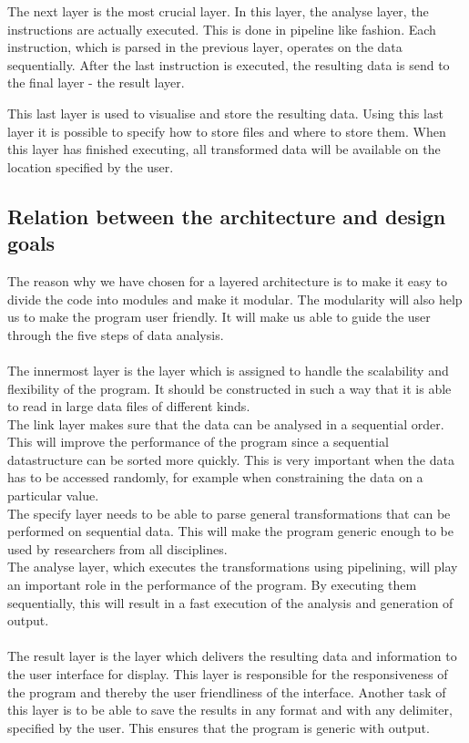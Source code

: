 \documentclass[a4paper,english,fleqn]{exam}
\begin{document}
The next layer is the most crucial layer. In this layer, the analyse layer, the instructions are actually executed. This is done in pipeline like fashion. Each instruction, which is parsed in the previous layer, operates on the data sequentially. After the last instruction is executed, the resulting data is send to the final layer - the result layer. 

This last layer is used to visualise and store the resulting data. Using this last layer it is possible to specify how to store files and where to store them. When this layer has finished executing, all transformed data will be available on the location specified by the user.

\subsection{Relation between the architecture and design goals}
The reason why we have chosen for a layered architecture is to make it easy to divide the code into modules and make it modular. The modularity will also help us to make the program user friendly. It will make us able to guide the user through the five steps of data analysis. \\ \\
The innermost layer is the layer which is assigned to handle the scalability and flexibility of the program. It should be constructed in such a way that it is able to read in large data files of different kinds. \\
The link layer makes sure that the data can be analysed in a sequential order. This will improve the performance of the program since a sequential datastructure can be sorted more quickly. This is very important when the data has to be accessed randomly, for example when constraining the data on a particular value. \\
The specify layer needs to be able to parse general transformations that can be performed on sequential data. This will make the program generic enough to be used by researchers from all disciplines.\\
The analyse layer, which executes the transformations using pipelining, will play an important role in the performance of the program. By executing them sequentially, this will result in a fast execution of the analysis and generation of output.\\ \\
The result layer is the layer which delivers the resulting data and information to the user interface for display. This layer is responsible for the responsiveness of the program and thereby the user friendliness of the interface. Another task of this layer is to be able to save the results in any format and with any delimiter, specified by the user. This ensures that the program is generic with output. 
\end{document}
